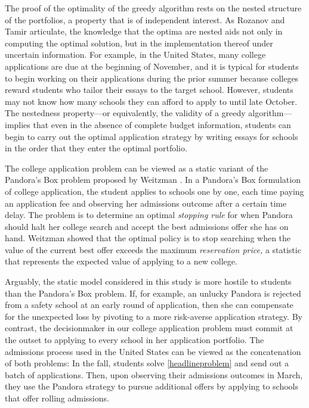The proof of the optimality of the greedy algorithm rests on the nested structure of the portfolios, a property that is of independent interest. As Rozanov and Tamir \cite{rozanovandtamir2020} articulate, the knowledge that the optima are nested aids not only in computing the optimal solution, but in the implementation thereof under uncertain information. For example, in the United States, many college applications are due at the beginning of November, and it is typical for students to begin working on their applications during the prior summer because colleges reward students who tailor their essays to the target school. However, students may not know how many schools they can afford to apply to until late October. The nestedness property---or equivalently, the validity of a greedy algorithm---implies that even in the absence of complete budget information, students can begin to carry out the optimal application strategy by writing essays for schools in the order that they enter the optimal portfolio.

The college application problem can be viewed as a static variant of the Pandora's Box problem proposed by Weitzman \cite{weitzman1979}. In a Pandora's Box formulation of college application, the student applies to schools one by one, each time paying an application fee and observing her admissions outcome after a certain time delay. The problem is to determine an optimal \emph{stopping rule} for when Pandora should halt her college search and accept the best admissions offer she has on hand. Weitzman showed that the optimal policy is to stop searching when the value of the current best offer exceeds the maximum \emph{reservation price,} a statistic that represents the expected value of applying to a new college.

Arguably, the static model considered in this study is more hostile to students than the Pandora's Box problem. If, for example, an unlucky Pandora is rejected from a safety school at an early round of application, then she can compensate for the unexpected loss by pivoting to a more risk-averse application strategy. By contrast, the decisionmaker in our college application problem must commit at the outset to applying to every school in her application portfolio. The admissions process used in the United States can be viewed as the concatenation of both problems: In the fall, students solve \eqref{headlineproblem} and send out a batch of applications. Then, upon observing their admissions outcomes in March, they use the Pandora strategy to pursue additional offers by applying to schools that offer rolling admissions.

